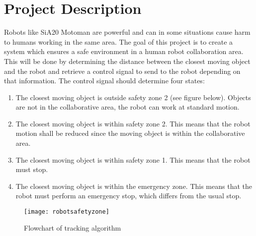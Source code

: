 
\section{Project Description}
Robots like SiA20 Motoman are powerful and can in some situations cause harm to humans working in the same area. The goal of this project is to create a system which ensures a safe environment in a human robot collaboration area. This will be done by determining the distance between the closest moving object and the robot and retrieve a control signal to send to the robot depending on that information. The control signal should determine four states:
\begin{enumerate}
\item The closest moving object is outside safety zone 2 (see figure below). Objects are not in the collaborative area, the robot can work at standard motion. 

\item The closest moving object is within safety zone 2. This means that the robot motion shall be reduced since the moving object is within the collaborative area.

\item The closest moving object is within safety zone 1. This means that the robot must stop.

\item The closest moving object is within the emergency zone. This means that the robot must perform an emergency stop, which differs from the usual stop. 
\end{enumerate}

\begin{figure}[H]
\begin{center}
\texttt{[image: robotsafetyzone]}
\caption{Flowchart of tracking algorithm}
\label{robotsafetyzone}
\end{center}
\end{figure}
